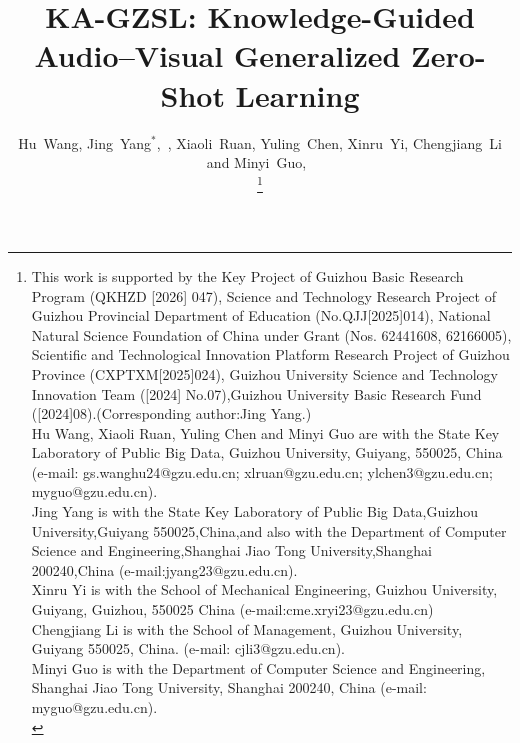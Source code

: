 \documentclass[lettersize,journal]{IEEEtran}
\begin{document}
\title{KA-GZSL: Knowledge-Guided Audio–Visual Generalized Zero-Shot Learning}

\author{
Hu~Wang,  %
Jing~Yang$^{*}$,~,
Xiaoli~Ruan,
Yuling~Chen,
Xinru~Yi,
Chengjiang~Li
and
Minyi~Guo,~




\thanks{This work is supported by the Key Project of Guizhou Basic Research Program (QKHZD [2026] 047), Science and Technology Research Project of Guizhou Provincial Department of Education (No.QJJ[2025]014), National Natural Science Foundation of China under Grant (Nos. 62441608, 62166005), Scientific and Technological Innovation Platform Research Project of Guizhou Province (CXPTXM[2025]024),
Guizhou University Science and Technology Innovation Team ([2024] No.07),Guizhou University Basic Research Fund ([2024]08).(Corresponding author:Jing Yang.)\\
  \indent Hu Wang, Xiaoli Ruan, Yuling Chen and Minyi Guo are with the State Key Laboratory
 of Public Big Data, Guizhou University, Guiyang, 550025, China (e-mail: gs.wanghu24@gzu.edu.cn; xlruan@gzu.edu.cn; ylchen3@gzu.edu.cn; myguo@gzu.edu.cn).\\
 \indent Jing Yang is with the State Key Laboratory of Public Big Data,Guizhou University,Guiyang 550025,China,and also with the Department of Computer Science and Engineering,Shanghai Jiao Tong University,Shanghai 200240,China (e-mail:jyang23@gzu.edu.cn).\\
 \indent Xinru Yi is with the School of Mechanical Engineering, Guizhou University, Guiyang, Guizhou, 550025 China (e-mail:cme.xryi23@gzu.edu.cn)\\
  \indent Chengjiang Li is with the School of Management, Guizhou University, Guiyang 550025, China. (e-mail: cjli3@gzu.edu.cn).\\
  \indent  Minyi Guo is with the Department of Computer Science and Engineering, Shanghai Jiao Tong University, Shanghai 200240, China (e-mail: myguo@gzu.edu.cn).\\
  }
}
\end{document}

